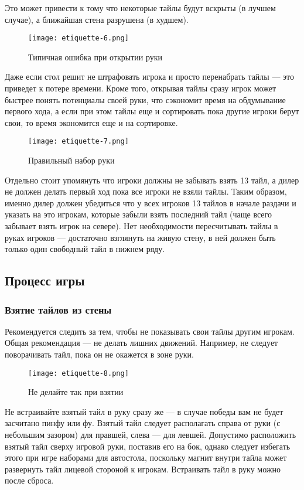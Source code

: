 Это может привести к тому что некоторые тайлы будут вскрыты (в лучшем случае), а ближайшая стена разрушена (в худшем).

\begin{figure}[H]
	\centering
	\texttt{[image: etiquette-6.png]}
	\caption{Типичная ошибка при открытии руки}
\end{figure}

Даже если стол решит не штрафовать игрока и просто перенабрать тайлы --- это приведет к потере времени. Кроме того, открывая тайлы сразу игрок может быстрее понять потенциалы своей руки, что сэкономит время на обдумывание первого хода, а если при этом тайлы еще и сортировать пока другие игроки берут свои, то время экономится еще и на сортировке.

\begin{figure}[H]
	\centering
	\texttt{[image: etiquette-7.png]}
	\caption{Правильный набор руки}
\end{figure}

Отдельно стоит упомянуть что игроки должны не забывать взять 13 тайл, а дилер не должен делать первый ход пока все игроки не взяли тайлы. Таким образом, именно дилер должен убедиться что у всех игроков 13 тайлов в начале раздачи и указать на это игрокам, которые забыли взять последний тайл (чаще всего забывает взять игрок на севере). Нет необходимости пересчитывать тайлы в руках игроков --- достаточно взглянуть на живую стену, в ней должен быть только один свободный тайл в нижнем ряду. 

\subsection{Процесс игры}

\subsubsection{Взятие тайлов из стены}

Рекомендуется следить за тем, чтобы не показывать свои тайлы другим игрокам. Общая рекомендация --- не делать лишних движений. Например, не следует поворачивать тайл, пока он не окажется в зоне руки.

\begin{figure}[H]
	\centering
	\texttt{[image: etiquette-8.png]}
	\caption{Не делайте так при взятии}
\end{figure}

Не встраивайте взятый тайл в руку сразу же --- в случае победы вам не будет засчитано пинфу или фу. Взятый тайл следует располагать справа от руки (с небольшим зазором) для правшей, слева --- для левшей. Допустимо расположить взятый тайл сверху игровой руки, поставив его на бок, однако следует избегать этого при игре наборами для автостола, поскольку магнит внутри тайла может развернуть тайл лицевой стороной к игрокам. Встраивать тайл в руку можно после сброса.


